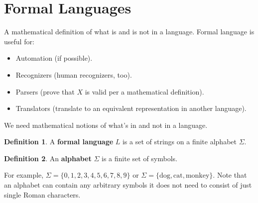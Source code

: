 \documentclass[]{article}
\theoremstyle{definition}
\newtheorem{defn}{Definition}[section]
\newcommand{\lecture}[1]{\marginpar{{\footnotesize $\leftarrow$ \underline{#1}}}}
\begin{document}
	\section{Formal Languages}
		A mathematical definition of what is and is not in a language. Formal language is useful for:
		\begin{itemize}
			\item Automation (if possible).
			\item Recognizers (human recognizers, too).
			\item Parsers (prove that $X$ is valid per a mathematical definition).
			\item Translators (translate to an equivalent representation in another language).
		\end{itemize}

		\lecture{February 4, 2013}
		We need mathematical notions of what's in and not in a language.

		\begin{defn}
		A \textbf{formal language} $L$ is a set of strings on a finite alphabet $\Sigma$.
		\end{defn}

		\begin{defn}
			An \textbf{alphabet} $\Sigma$ is a finite set of symbols.
		\end{defn}
		For example, $\Sigma = \{0, 1, 2, 3, 4, 5, 6, 7, 8, 9\}$ or $\Sigma = \{ \text{dog}, \text{cat}, \text{monkey} \}$. Note that an alphabet can contain any arbitrary symbols \textendash{} it does not need to consist of just single Roman characters.
\end{document}
